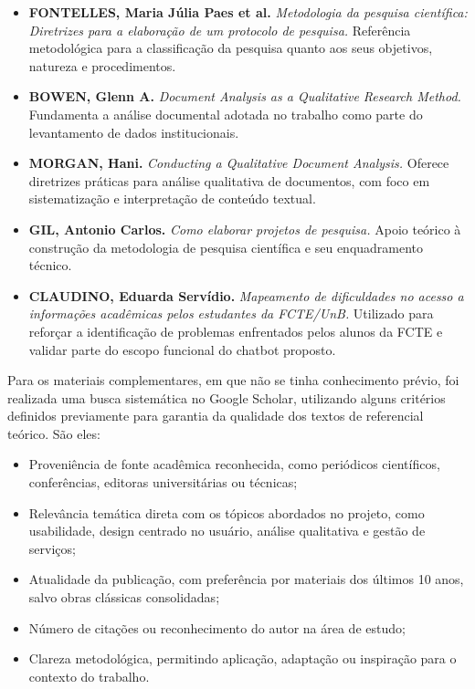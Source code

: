 \begin{itemize}
    \item \textbf{FONTELLES, Maria Júlia Paes et al.} \textit{Metodologia da pesquisa científica: Diretrizes para a elaboração de um protocolo de pesquisa.} Referência metodológica para a classificação da pesquisa quanto aos seus objetivos, natureza e procedimentos.

    \item \textbf{BOWEN, Glenn A.} \textit{Document Analysis as a Qualitative Research Method.} Fundamenta a análise documental adotada no trabalho como parte do levantamento de dados institucionais.

    \item \textbf{MORGAN, Hani.} \textit{Conducting a Qualitative Document Analysis.} Oferece diretrizes práticas para análise qualitativa de documentos, com foco em sistematização e interpretação de conteúdo textual.

    \item \textbf{GIL, Antonio Carlos.} \textit{Como elaborar projetos de pesquisa.} Apoio teórico à construção da metodologia de pesquisa científica e seu enquadramento técnico.

    \item \textbf{CLAUDINO, Eduarda Servídio.} \textit{Mapeamento de dificuldades no acesso a informações acadêmicas pelos estudantes da FCTE/UnB.} Utilizado para reforçar a identificação de problemas enfrentados pelos alunos da FCTE e validar parte do escopo funcional do chatbot proposto.
\end{itemize}

Para os materiais complementares, em que não se tinha conhecimento prévio, foi realizada uma busca sistemática no Google Scholar, utilizando alguns critérios definidos previamente para garantia da qualidade dos textos de referencial teórico. São eles:

\begin{itemize}
    \item Proveniência de fonte acadêmica reconhecida, como periódicos científicos, conferências, editoras universitárias ou técnicas;
    \item Relevância temática direta com os tópicos abordados no projeto, como usabilidade, design centrado no usuário, análise qualitativa e gestão de serviços;
    \item Atualidade da publicação, com preferência por materiais dos últimos 10 anos, salvo obras clássicas consolidadas;
    \item Número de citações ou reconhecimento do autor na área de estudo;
    \item Clareza metodológica, permitindo aplicação, adaptação ou inspiração para o contexto do trabalho.
\end{itemize}

